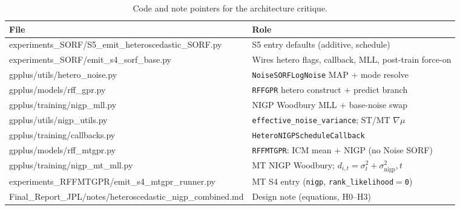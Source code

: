 \documentclass[11pt]{article}
\newcommand{\signigp}{\sigma_{\mathrm{nigp}}^{2}}
\begin{document}
\begin{table}[H]
\centering
\small
\begin{tabular}{@{}>{\ttfamily\raggedright\arraybackslash}p{6.2cm}
  >{\raggedright\arraybackslash}p{6.4cm}@{}}
\toprule
\textbf{\textrm{File}} & \textbf{Role} \\
\midrule
experiments\_SORF/S5\_emit\_heteroscedastic\_SORF.py
& S5 entry defaults (additive, schedule) \\
experiments\_SORF/emit\_s4\_sorf\_base.py
& Wires hetero flags, callback, MLL, post-train force-on \\
gpplus/utils/hetero\_noise.py
& \texttt{NoiseSORFLogNoise} MAP $+$ mode resolve \\
gpplus/models/rff\_gpr.py
& \texttt{RFFGPR} hetero construct $+$ predict branch \\
gpplus/training/nigp\_mll.py
& NIGP Woodbury MLL $+$ base-noise swap \\
gpplus/utils/nigp\_utils.py
& \texttt{effective\_noise\_variance}; ST/MT $\nabla\mu$ \\
gpplus/training/callbacks.py
& \texttt{HeteroNIGPScheduleCallback} \\
gpplus/models/rff\_mtgpr.py
& \texttt{RFFMTGPR}: ICM mean $+$ NIGP (no Noise SORF) \\
gpplus/training/nigp\_mt\_mll.py
& MT NIGP Woodbury; $d_{i,t}=\sigma_{t}^{2}+\signigp,t$ \\
experiments\_RFFMTGPR/emit\_s4\_mtgpr\_runner.py
& MT S4 entry (\texttt{nigp}, \texttt{rank\_likelihood$=$0}) \\
Final\_Report\_JPL/notes/heteroscedastic\_nigp\_combined.md
& Design note (equations, H0--H3) \\
\bottomrule
\end{tabular}
\caption{Code and note pointers for the architecture critique.}
\label{tab:files}
\end{table}



\end{document}
